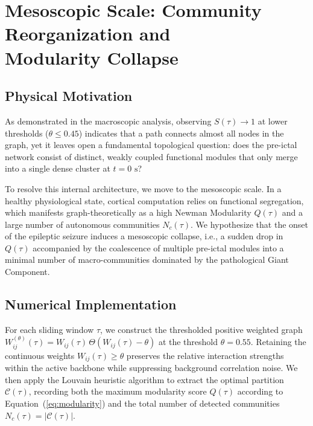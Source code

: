 \section[Mesoscopic Scale: Communities and Modularity]{Mesoscopic Scale: Community Reorganization and\\Modularity Collapse}
\label{sec:act2_meso}

\subsection{Physical Motivation}
As demonstrated in the macroscopic analysis, observing $S(\tau) \to 1$ at lower thresholds ($\theta \leq 0.45$) indicates that a path connects almost all nodes in the graph, yet it leaves open a fundamental topological question: does the pre-ictal network consist of distinct, weakly coupled functional modules that only merge into a single dense cluster at $t = 0\text{ s}$?

To resolve this internal architecture, we move to the mesoscopic scale. In a healthy physiological state, cortical computation relies on functional segregation, which manifests graph-theoretically as a high Newman Modularity $Q(\tau)$ and a large number of autonomous communities $N_c(\tau)$. We hypothesize that the onset of the epileptic seizure induces a mesoscopic collapse, i.e., a sudden drop in $Q(\tau)$ accompanied by the coalescence of multiple pre-ictal modules into a minimal number of macro-communities dominated by the pathological Giant Component.

\subsection{Numerical Implementation}
For each sliding window $\tau$, we construct the thresholded positive weighted graph $W_{ij}^{(\theta)}(\tau) = W_{ij}(\tau) \, \Theta(W_{ij}(\tau) - \theta)$ at the threshold $\theta = 0.55$. Retaining the continuous weights $W_{ij}(\tau) \geq \theta$ preserves the relative interaction strengths within the active backbone while suppressing background correlation noise. We then apply the Louvain heuristic algorithm to extract the optimal partition $\mathcal{C}(\tau)$, recording both the maximum modularity score $Q(\tau)$ according to Equation~(\ref{eq:modularity}) and the total number of detected communities $N_c(\tau) = |\mathcal{C}(\tau)|$.


